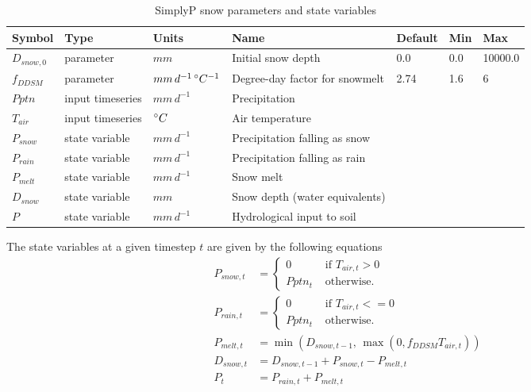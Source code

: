 \documentclass[11pt]{article}
\theoremstyle{definition}
\begin{document}
\begin{table}[H]
\centering
\label{tab:simplypsnow}
\begin{tabular}{|lllllll|}
\hline
Symbol & Type & Units & Name & Default & Min & Max \\
\hline
$D_{snow,0}$ & parameter & $mm$                                    & Initial snow depth & 0.0 & 0.0 & 10000.0\\
$f_{DDSM}$    & parameter & $mm\, d^{-1}\, \degree C^{-1}$ & Degree-day factor for snowmelt & 2.74 &1.6 & 6\\
\hline
$Pptn$            & input timeseries &  $mm\, d^{-1}$                     & Precipitation & & & \\
$T_{air}$        & input timeseries & $\degree C$                           & Air temperature & & & \\
\hline
$P_{snow}$   & state variable &  $mm\, d^{-1}$               & Precipitation falling as snow & & & \\
$P_{rain}$     & state variable &   $mm\, d^{-1}$              & Precipitation falling as rain & & & \\
$P_{melt}$   & state variable &  $mm\, d^{-1}$                & Snow melt & & & \\
$D_{snow}$   & state variable & $mm$                                & Snow depth (water equivalents) & & & \\
$P$               & state variable &  $mm\, d^{-1}$                & Hydrological input to soil & & &\\
\hline
\end{tabular}
\caption{SimplyP snow parameters and state variables}
\end{table}
The state variables at a given timestep $t$ are given by the following equations
\begin{align*}
P_{snow,t} &= \begin{cases}
0 & \mbox{ if }T_{air,t} > 0\\
Pptn_t & \mbox{ otherwise.}
\end{cases}\\
P_{rain,t} &= \begin{cases}
0 & \mbox{ if }T_{air,t} <= 0\\
Pptn_t & \mbox{ otherwise.}
\end{cases}\\
P_{melt,t} &= \min(D_{snow,t-1},  \,\max(0, f_{DDSM}T_{air,t}))\\
D_{snow,t} &= D_{snow,t-1}+P_{snow,t}-P_{melt,t}\\
P_t &= P_{rain,t} + P_{melt,t}
\end{align*}
\end{document}
